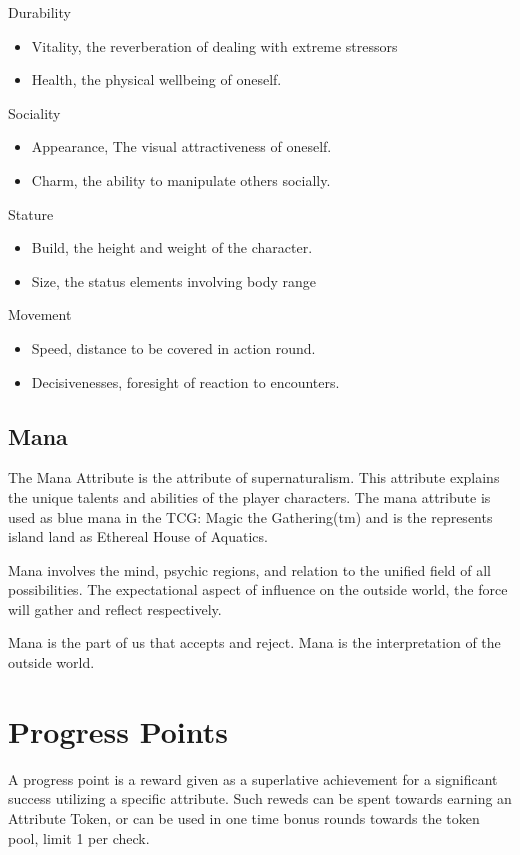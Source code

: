\documentclass{article}
\begin{document}
Durability
\begin{itemize}
\item Vitality, the reverberation of dealing with extreme stressors
\item Health, the physical wellbeing of oneself.
\end{itemize}

Sociality
\begin{itemize}
\item Appearance, The visual attractiveness of oneself.
\item Charm, the ability to manipulate others socially.
\end{itemize}

Stature
\begin{itemize}
\item Build, the height and weight of the character.
\item Size, the status elements involving body range
\end{itemize}

Movement
\begin{itemize}
\item Speed, distance to be covered in action round.
\item Decisivenesses, foresight of reaction to encounters.
\end{itemize}

\subsection{Mana}

The Mana Attribute is the attribute of supernaturalism. This attribute explains the unique talents and abilities of the player characters. The mana attribute is used as blue mana in the TCG: Magic the Gathering(tm) and is the represents island land as Ethereal House of Aquatics.

Mana involves the mind, psychic regions, and relation to the unified field of all possibilities. The expectational aspect of influence on the outside world, the force will gather and reflect respectively.

Mana is the part of us that accepts and reject. Mana is the interpretation of the outside world.

\section{Progress Points}

A progress point is a reward given as a superlative achievement for a significant success utilizing a specific attribute. Such reweds can be spent towards earning an Attribute Token, or can be used in one time bonus rounds towards the token pool, limit 1 per check.
\end{document}
